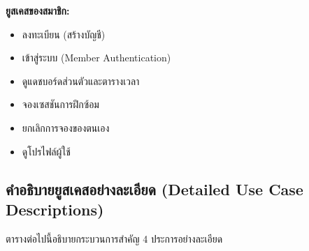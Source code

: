 \textbf{ยูสเคสของสมาชิก:}
\begin{itemize}
    \item ลงทะเบียน (สร้างบัญชี)
    \item เข้าสู่ระบบ (Member Authentication)
    \item ดูแดชบอร์ดส่วนตัวและตารางเวลา
    \item จองเซสชันการฝึกซ้อม
    \item ยกเลิกการจองของตนเอง
    \item ดูโปรไฟล์ผู้ใช้
\end{itemize}

\subsection{คำอธิบายยูสเคสอย่างละเอียด (Detailed Use Case Descriptions)}
ตารางต่อไปนี้อธิบายกระบวนการสำคัญ 4 ประการอย่างละเอียด

